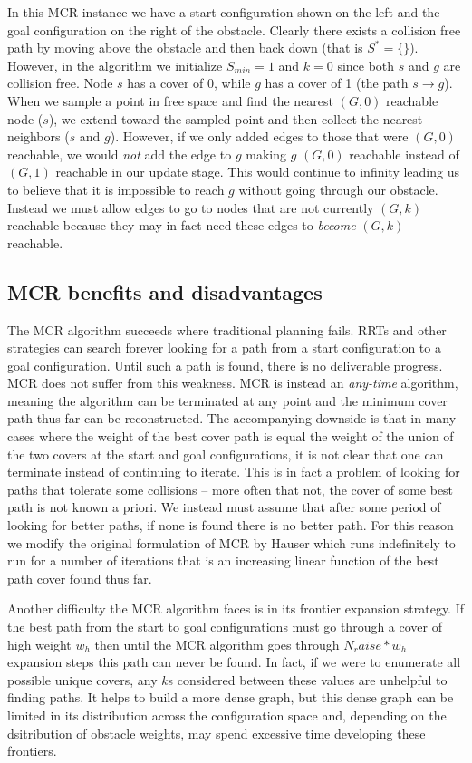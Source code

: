 In this MCR instance we have a start configuration shown on the left and the goal configuration on the right of the obstacle. Clearly there exists a collision free path by moving above the obstacle and then back down (that is $S^{*} = \{\}$). However, in the algorithm we initialize $S_{min} = 1$ and $k=0$ since both $s$ and $g$ are collision free. Node $s$ has a cover of 0, while $g$ has a cover of 1 (the path $s \rightarrow g$). When we sample a point in free space and find the nearest $(G,0)$ reachable node ($s$), we extend toward the sampled point and then collect the nearest neighbors ($s$ and $g$). However, if we only added edges to those that were $(G,0)$ reachable, we would \emph{not} add the edge to $g$ making $g$ $(G,0)$ reachable instead of $(G,1)$ reachable in our update stage. This would continue to infinity leading us to believe that it is impossible to reach $g$ without going through our obstacle. Instead we must allow edges to go to nodes that are not currently $(G,k)$ reachable because they may in fact need these edges to \emph{become} $(G,k)$ reachable.

\subsection{MCR benefits and disadvantages}
The MCR algorithm succeeds where traditional planning fails. RRTs and other strategies can search forever looking for a path from a start configuration to a goal configuration. Until such a path is found, there is no deliverable progress. MCR does not suffer from this weakness. MCR is instead an \emph{any-time} algorithm, meaning the algorithm can be terminated at any point and the minimum cover path thus far can be reconstructed. The accompanying downside is that in many cases where the weight of the best cover path is equal the weight of the union of the two covers at the start and goal configurations, it is not clear that one can terminate instead of continuing to iterate. This is in fact a problem of looking for paths that tolerate some collisions -- more often that not, the cover of some best path is not known a priori. We instead must assume that after some period of looking for better paths, if none is found there is no better path. For this reason we modify the original formulation of MCR by Hauser which runs indefinitely to run for a number of iterations that is an increasing linear function of the best path cover found thus far.

Another difficulty the MCR algorithm faces is in its frontier expansion strategy. If the best path from the start to goal configurations must go through a cover of high weight $w_h$ then until the MCR algorithm goes through $N_raise * w_h$ expansion steps this path can never be found. In fact, if we were to enumerate all possible unique covers, any $k$s considered between these values are unhelpful to finding paths. It helps to build a more dense graph, but this dense graph can be limited in its distribution across the configuration space and, depending on the dsitribution of obstacle weights, may spend excessive time developing these frontiers.

